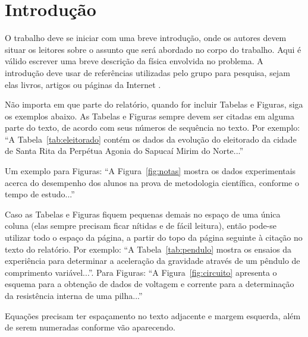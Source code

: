 \documentclass{relatorio}
\begin{document}
\maketitle

\section{Introdução}

O trabalho deve se iniciar com uma breve introdução, onde os autores devem situar os leitores sobre o assunto que será abordado no corpo do trabalho. Aqui é válido escrever uma breve descrição da física envolvida no problema. A introdução deve usar de referências utilizadas pelo grupo para pesquisa, sejam elas livros, artigos ou páginas da Internet \citep{osada1972}.

Não importa em que parte do relatório, quando for incluir Tabelas e Figuras, siga os exemplos abaixo. As Tabelas e Figuras sempre devem ser citadas em alguma parte do texto, de acordo com seus números de sequência no texto. Por exemplo: ``A Tabela~\ref{tab:eleitorado} contém os dados da evolução do eleitorado da cidade de Santa Rita da Perpétua Agonia do Sapucaí Mirim do Norte...''


Um exemplo para Figuras: ``A Figura~\ref{fig:notas} mostra os dados experimentais acerca do desempenho dos alunos na prova de metodologia científica, conforme o tempo de estudo...''


Caso as Tabelas e Figuras fiquem pequenas demais no espaço de uma única coluna (elas sempre precisam ficar nítidas e de fácil leitura), então pode-se utilizar todo o espaço da página, a partir do topo da página seguinte à citação no texto do relatório. Por exemplo: ``A Tabela~\ref{tab:pendulo} mostra os ensaios da experiência para determinar a aceleração da gravidade através de um pêndulo de comprimento variável...''. Para Figuras: ``A Figura~\ref{fig:circuito} apresenta o esquema para a obtenção de dados de voltagem e corrente para a determinação da resistência interna de uma pilha...''

Equações precisam ter espaçamento no texto adjacente e margem esquerda, além de serem numeradas conforme vão aparecendo.

\clearpage

\begin{faixa}
\end{faixa}
\end{document}
